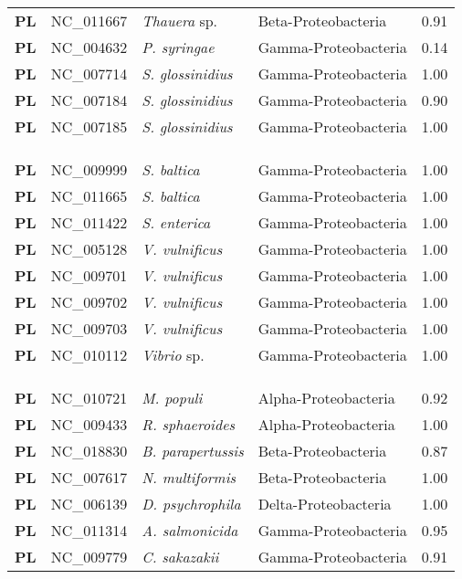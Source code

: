 \begin{adjustwidth}{-3cm}{2cm}
{\begin{supertabular}{>{\bfseries}l|p{0.1\textwidth}p{0.14\textwidth}l|l}
PL & NC\_011667 & \textit{Thauera} sp. & Beta-Proteobacteria & 0.91\\
PL & NC\_004632 & \textit{P. syringae} & Gamma-Proteobacteria & 0.14\\
PL & NC\_007714 & \textit{S. glossinidius} & Gamma-Proteobacteria & 1.00\\
PL & NC\_007184 & \textit{S. glossinidius} & Gamma-Proteobacteria & 0.90\\
PL & NC\_007185 & \textit{S. glossinidius} & Gamma-Proteobacteria & 1.00\\
\\
\\
\hline\\
PL & NC\_009999 & \textit{S. baltica} & Gamma-Proteobacteria & 1.00\\
PL & NC\_011665 & \textit{S. baltica} & Gamma-Proteobacteria & 1.00\\
PL & NC\_011422 & \textit{S. enterica} & Gamma-Proteobacteria & 1.00\\
PL & NC\_005128 & \textit{V. vulnificus} & Gamma-Proteobacteria & 1.00\\
PL & NC\_009701 & \textit{V. vulnificus} & Gamma-Proteobacteria & 1.00\\
PL & NC\_009702 & \textit{V. vulnificus} & Gamma-Proteobacteria & 1.00\\
PL & NC\_009703 & \textit{V. vulnificus} & Gamma-Proteobacteria & 1.00\\
PL & NC\_010112 & \textit{Vibrio} sp. & Gamma-Proteobacteria & 1.00\\
\\
\\
\hline\\
PL & NC\_010721 & \textit{M. populi} & Alpha-Proteobacteria & 0.92\\
PL & NC\_009433 & \textit{R. sphaeroides} & Alpha-Proteobacteria & 1.00\\
PL & NC\_018830 & \textit{B. parapertussis} & Beta-Proteobacteria & 0.87\\
PL & NC\_007617 & \textit{N. multiformis} & Beta-Proteobacteria & 1.00\\
PL & NC\_006139 & \textit{D. psychrophila} & Delta-Proteobacteria & 1.00\\
PL & NC\_011314 & \textit{A. salmonicida} & Gamma-Proteobacteria & 0.95\\
PL & NC\_009779 & \textit{C. sakazakii} & Gamma-Proteobacteria & 0.91\\

\end{supertabular}}
\end{adjustwidth}
